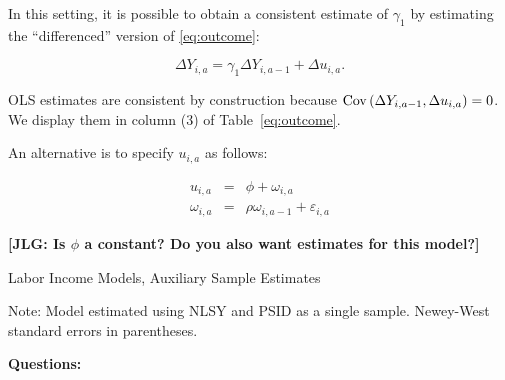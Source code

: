\noindent In this setting, it is possible to obtain a consistent estimate of $\gamma_{1}$ by estimating the ``differenced'' version of \eqref{eq:outcome}: 

\begin{equation}
\Delta Y_{i,a} = \gamma_{1} \Delta Y_{i,a-1} + \Delta u_{i,a}. \label{eq:doutcome}
\end{equation}

\noindent OLS estimates are consistent by construction because $\operatorname{Cov} \left( \Delta Y_{i,a-1}, \Delta u_{i,a} \right) = 0$. We display them in column (3) of Table~\ref{eq:outcome}. 

\noindent An alternative is to specify $u_{i,a}$ as follows: 

\begin{eqnarray}
u_{i,a} &=& \phi + \omega_{i,a} \\ \nonumber
\omega_{i,a} &=& \rho \omega_{i,a-1} + \varepsilon_{i,a} 
\end{eqnarray}

\noindent \textbf{[JLG: Is $\phi$ a constant? Do you also want estimates for this model?]}\\

\begin{table}[H] 
\begin{threeparttable}
\caption{Labor Income Models, Auxiliary Sample Estimates}
\label{table:outcome}
\centering 

\begin{tablenotes}
\footnotesize
\item Note: Model estimated using NLSY and PSID as a single sample. Newey-West standard errors in parentheses.
\end{tablenotes}
\end{threeparttable}
\end{table}

\noindent \textbf{Questions:}

